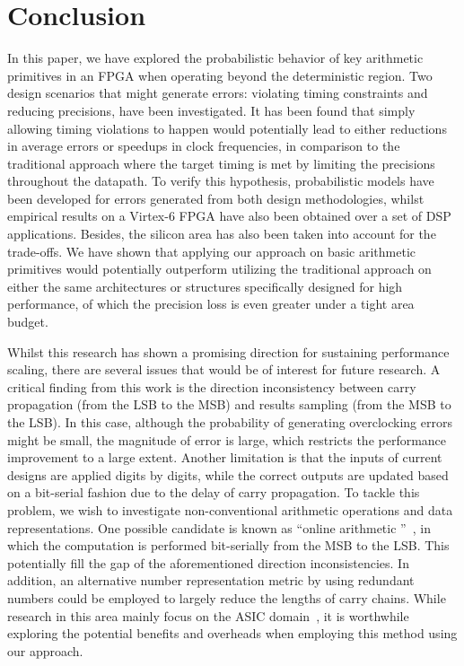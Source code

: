 \documentclass[prodmode,acmtrets]{acmsmall} %
\begin{document}
\section{Conclusion}  \label{Section_Conclusion}
In this paper, we have explored the probabilistic behavior of key arithmetic primitives in an FPGA when operating beyond the deterministic region. Two design scenarios that might generate errors: violating timing constraints and reducing precisions, have been investigated. It has been found that simply allowing timing violations to happen would potentially lead to either reductions in average errors or speedups in clock frequencies, in comparison to the traditional approach where the target timing is met by limiting the precisions throughout the datapath. To verify this hypothesis, probabilistic models have been developed for errors generated from both design methodologies, whilst empirical results on a Virtex-6 FPGA have also been obtained over a set of DSP applications. Besides, the silicon area has also been taken into account for the trade-offs. We have shown that applying our approach on basic arithmetic primitives would potentially outperform utilizing the traditional approach on either the same architectures or structures specifically designed for high performance, of which the precision loss is even greater under a tight area budget.

Whilst this research has shown a promising direction for sustaining performance scaling, there are several issues that would be of interest for future research. A critical finding from this work is the direction inconsistency between carry propagation (from the LSB to the MSB) and results sampling (from the MSB to the LSB). In this case, although the probability of generating overclocking errors might be small, the magnitude of error is large, which restricts the performance improvement to a large extent. Another limitation is that the inputs of current designs are applied digits by digits, while the correct outputs are updated based on a bit-serial fashion due to the delay of carry propagation.  To tackle this problem, we wish to investigate non-conventional arithmetic operations and data representations. One possible candidate is known as ``online arithmetic ''~\cite{Ercegovac_Overview,Ercegovac_Book}, in which the computation is performed bit-serially from the MSB to the LSB. This potentially fill the gap of the aforementioned direction inconsistencies. In addition, an alternative number representation metric by using redundant numbers could be employed to largely reduce the lengths of carry chains. While research in this area mainly focus on the ASIC domain~\cite{RedundantMult_1985,RedundantMult_1987}, it is worthwhile exploring the potential benefits and overheads when employing this method using our approach.
\end{document}
